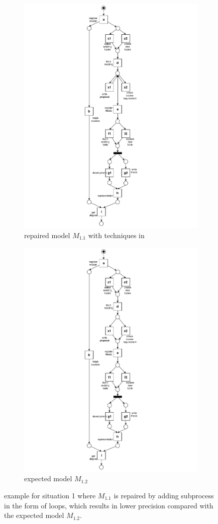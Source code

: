 \begin{figure}[htp]
	\centering
	\begin{subfigure}[b]{0.48\textwidth}
		\centering
		\includegraphics[clip, trim=7cm 0cm 7cm 0cm, width=0.5\linewidth, height=0.7\textheight]{figures/introduction/Master-add-events-loop.pdf}
		\caption{repaired model $M_{1.1}$ with techniques in \cite{fahland2015model}}
		\label{fig:model_b1}
	\end{subfigure}%
	\begin{subfigure}[b]{0.48\textwidth}
		\centering
		\includegraphics[clip, trim=7cm 0cm 7cm 0cm, width=0.5\linewidth, height=0.7\textheight]{figures/introduction/Master-add-events.pdf}
		\caption{expected model $M_{1.2}$}
		\label{fig:model_b2}
	\end{subfigure}
	\caption{example for situation 1 where $M_{1.1}$ is repaired by adding subprocess in the form of loops, which results in lower precision compared with the expected model $M_{1.2}$.}
	\label{fig:model_change_1}
\end{figure}

